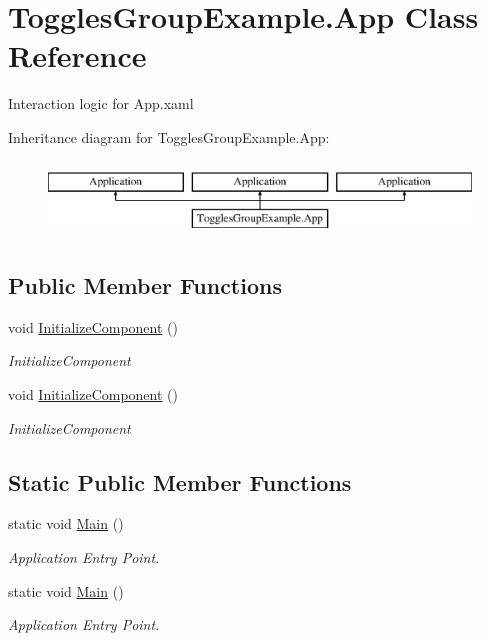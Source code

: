 \hypertarget{class_toggles_group_example_1_1_app}{}\section{Toggles\+Group\+Example.\+App Class Reference}
\label{class_toggles_group_example_1_1_app}


Interaction logic for App.\+xaml  


Inheritance diagram for Toggles\+Group\+Example.\+App\+:\begin{figure}[H]
\begin{center}
\leavevmode
\includegraphics[height=2.000000cm]{d2/d95/class_toggles_group_example_1_1_app}
\end{center}
\end{figure}
\subsection*{Public Member Functions}
\begin{DoxyCompactItemize}
\item 
void \mbox{\hyperlink{class_toggles_group_example_1_1_app_aaa7c884b31976916991edc22ba344fdb}{Initialize\+Component}} ()
\begin{DoxyCompactList}\small\item\em Initialize\+Component \end{DoxyCompactList}\item 
void \mbox{\hyperlink{class_toggles_group_example_1_1_app_aaa7c884b31976916991edc22ba344fdb}{Initialize\+Component}} ()
\begin{DoxyCompactList}\small\item\em Initialize\+Component \end{DoxyCompactList}\end{DoxyCompactItemize}
\subsection*{Static Public Member Functions}
\begin{DoxyCompactItemize}
\item 
static void \mbox{\hyperlink{class_toggles_group_example_1_1_app_a2ed47f800daada4ed8182995569bf206}{Main}} ()
\begin{DoxyCompactList}\small\item\em Application Entry Point. \end{DoxyCompactList}\item 
static void \mbox{\hyperlink{class_toggles_group_example_1_1_app_a2ed47f800daada4ed8182995569bf206}{Main}} ()
\begin{DoxyCompactList}\small\item\em Application Entry Point. \end{DoxyCompactList}\end{DoxyCompactItemize}


